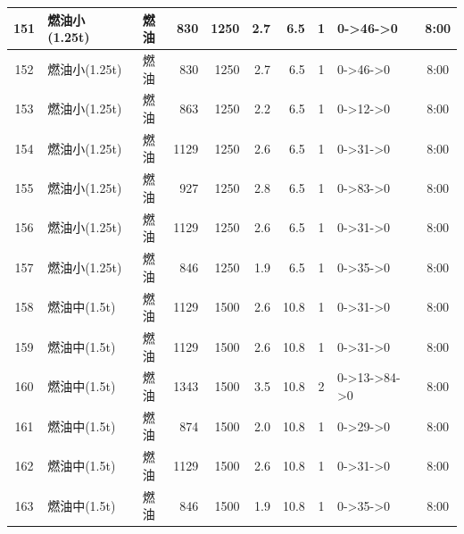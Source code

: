 \begin{landscape}
\begin{longtable}{|c|l|c|r|r|r|r|c|p{2.8cm}|c|}
\hline
\rowcolor{gray!8}
151 & 燃油小(1.25t) & 燃油 & 830 & 1250 & 2.7 & 6.5 & 1 & 0->46->0 & 8:00 \\
\hline
152 & 燃油小(1.25t) & 燃油 & 830 & 1250 & 2.7 & 6.5 & 1 & 0->46->0 & 8:00 \\
\hline
\rowcolor{gray!8}
153 & 燃油小(1.25t) & 燃油 & 863 & 1250 & 2.2 & 6.5 & 1 & 0->12->0 & 8:00 \\
\hline
154 & 燃油小(1.25t) & 燃油 & 1129 & 1250 & 2.6 & 6.5 & 1 & 0->31->0 & 8:00 \\
\hline
\rowcolor{gray!8}
155 & 燃油小(1.25t) & 燃油 & 927 & 1250 & 2.8 & 6.5 & 1 & 0->83->0 & 8:00 \\
\hline
156 & 燃油小(1.25t) & 燃油 & 1129 & 1250 & 2.6 & 6.5 & 1 & 0->31->0 & 8:00 \\
\hline
\rowcolor{gray!8}
157 & 燃油小(1.25t) & 燃油 & 846 & 1250 & 1.9 & 6.5 & 1 & 0->35->0 & 8:00 \\
\hline
158 & 燃油中(1.5t) & 燃油 & 1129 & 1500 & 2.6 & 10.8 & 1 & 0->31->0 & 8:00 \\
\hline
\rowcolor{gray!8}
159 & 燃油中(1.5t) & 燃油 & 1129 & 1500 & 2.6 & 10.8 & 1 & 0->31->0 & 8:00 \\
\hline
160 & 燃油中(1.5t) & 燃油 & 1343 & 1500 & 3.5 & 10.8 & 2 & 0->13->84->0 & 8:00 \\
\hline
\rowcolor{gray!8}
161 & 燃油中(1.5t) & 燃油 & 874 & 1500 & 2.0 & 10.8 & 1 & 0->29->0 & 8:00 \\
\hline
162 & 燃油中(1.5t) & 燃油 & 1129 & 1500 & 2.6 & 10.8 & 1 & 0->31->0 & 8:00 \\
\hline
\rowcolor{gray!8}
163 & 燃油中(1.5t) & 燃油 & 846 & 1500 & 1.9 & 10.8 & 1 & 0->35->0 & 8:00 \\
\hline
\end{longtable}
\end{landscape}

